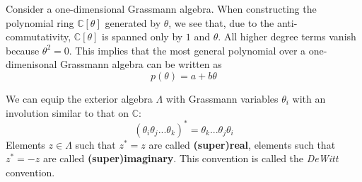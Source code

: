	\begin{property}
		Consider a one-dimensional Grassmann algebra. When constructing the polynomial ring $\mathbb{C}[\theta]$ generated by $\theta$, we see that, due to the anti-commutativity, $\mathbb{C}[\theta]$ is spanned only by $1$ and $\theta$. All higher degree terms vanish because $\theta^2 = 0$. This implies that the most general polynomial over a one-dimenisonal Grassmann algebra can be written as
		\begin{equation}
			p(\theta) = a + b\theta
		\end{equation}
	\end{property}
	
	\begin{definition}
		We can equip the exterior algebra $\Lambda$ with Grassmann variables $\theta_i$ with an involution similar to that on $\mathbb{C}$:
		\begin{equation}
			(\theta_i\theta_j...\theta_k)^* = \theta_k...\theta_j\theta_i
		\end{equation}
		Elements $z\in\Lambda$ such that $z^* = z$ are called \textbf{(super)real}, elements such that $z^* = -z$ are called \textbf{(super)imaginary}. This convention is called the \textit{DeWitt} convention.
	\end{definition}
